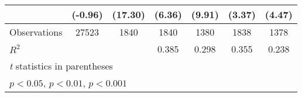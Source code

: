 \begin{table}[htbp]
\begin{tabular}{l*{6}{c}}
                    &     (-0.96)         &     (17.30)         &      (6.36)         &      (9.91)         &      (3.37)         &      (4.47)         \\
\midrule
Observations        &       27523         &        1840         &        1840         &        1380         &        1838         &        1378         \\
\(R^{2}\)           &                     &                     &       0.385         &       0.298         &       0.355         &       0.238         \\
\bottomrule
\multicolumn{7}{l}{\footnotesize \textit{t} statistics in parentheses}\\
\multicolumn{7}{l}{\footnotesize \sym{*} \(p<0.05\), \sym{**} \(p<0.01\), \sym{***} \(p<0.001\)}\\
\end{tabular}
\end{table}
